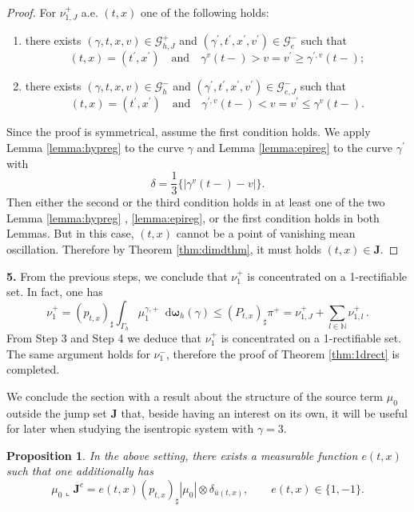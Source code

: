 \documentclass[11pt, twoside, reqno]{amsart}
\newtheorem{prop}[thm]{Proposition}
\theoremstyle{definition}
\theoremstyle{remark}
\numberwithin{equation}{section}
\newcommand*\dif{\mathop{}\!\mathrm{d}}
\newcommand{\mc}[1]{\mathcal{#1}}
\newcommand{\bs}[1]{\boldsymbol{#1}}
\begin{document}
\begin{proof}
    For $\nu^+_{1,J}$ a.e. $(t, x)$ one of the following holds:
    \begin{enumerate}
        \item there exists $(\gamma, t, x, v) \in \mc G^+_{h, J}$ and $(\gamma^{\prime}, t^{\prime}, x^{\prime}, v^{\prime}) \in \mc G^-_e$ such that 
        $$
        (t, x) = (t^{\prime}, x^{\prime}) \quad \text{and} \quad \gamma^v(t-)> v = v^{\prime} \geq \gamma^{\prime,v}(t-);
        $$
         \item there exists $(\gamma, t, x, v) \in \mc G^-_{h}$ and $(\gamma^{\prime}, t^{\prime}, x^{\prime}, v^{\prime}) \in \mc G^-_{e,J}$ such that 
        $$
        (t, x) = (t^{\prime}, x^{\prime}) \quad \text{and} \quad \gamma^{\prime, v}(t-)< v = v^{\prime} \leq \gamma^{v}(t-).
        $$
    \end{enumerate}
Since the proof is symmetrical, assume the first condition holds. We apply Lemma \ref{lemma:hypreg} to the curve $\gamma$ and Lemma \ref{lemma:epireg} to the curve $\gamma^{\prime}$ with 
$$
\delta = \frac{1}{3}\{|\gamma^v(t-)-v| \}.
$$
Then either the second or the third condition holds in at least one of the two Lemma \ref{lemma:hypreg} , \ref{lemma:epireg}, or the first condition holds in both Lemmas.  But in this case, $(t, x)$ cannot be a point of vanishing mean oscillation. Therefore by Theorem \ref{thm:dimdthm}, it must holds $(t, x) \in \mathbf J$.
\end{proof}

\vspace{0.5cm}
\textbf{5.} From the previous steps, we conclude that $\nu^+_1$ is concentrated on a 1-rectifiable set. In fact, one has 
\begin{equation}
    \nu^+_1 = (p_{t,x})_{\sharp} \int_{\Gamma_h} \mu_1^{\gamma,+} \dif \bs \omega_h(\gamma) \leq  (P_{t,x})_{\sharp} \pi^+ = \nu^+_{1, J} + \sum_{l \in \mathbb N} \nu^+_{1,l}\,.
\end{equation}
From Step 3 and Step 4 we deduce that $\nu^+_1 $ is concentrated on a 1-rectifiable set.
The same argument holds for $\nu_1^-$, therefore the proof of Theorem \ref{thm:1drect} is completed. 

\vspace{0.5cm}
We conclude the section with a result about the structure of the source term $\mu_0$ outside the jump set $\mathbf J$ that, beside having an interest on its own, it will be useful for later when studying the isentropic system with $\gamma = 3$.
\begin{prop}\label{prop:sourcestruct}
    In the above setting, there exists a measurable function $e(t,x)$ such that one additionally has 
    \begin{equation}\label{eq:mu0form}
        \mu_0 \llcorner \mathbf J^c = e(t,x) (p_{t,x})_\sharp |\mu_0| \otimes \delta_{\bar u(t,x)}, \qquad e(t,x) \in \{1, -1\}.
    \end{equation}
\end{prop}
\end{document}
